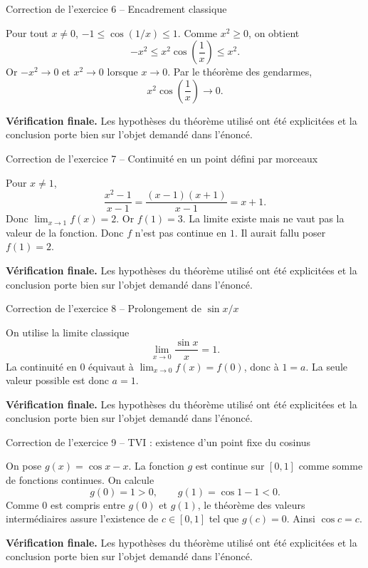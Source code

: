 \documentclass[11pt,a4paper]{article}
\begin{document}
\begin{corrbox}{Correction de l'exercice 6 -- Encadrement classique}

Pour tout $x\neq0$, $-1\leq\cos(1/x)\leq1$. Comme $x^2\geq0$, on obtient
\[
-x^2\leq x^2\cos\left(\frac1x\right)\leq x^2.
\]
Or $-x^2\to0$ et $x^2\to0$ lorsque $x\to0$. Par le théorème des gendarmes,
\[
x^2\cos\left(\frac1x\right)\to0.
\]

\medskip
\textbf{Vérification finale.} Les hypothèses du théorème utilisé ont été explicitées et la conclusion porte bien sur l'objet demandé dans l'énoncé.
\end{corrbox}


\begin{corrbox}{Correction de l'exercice 7 -- Continuité en un point défini par morceaux}

Pour $x\neq1$,
\[
\frac{x^2-1}{x-1}=\frac{(x-1)(x+1)}{x-1}=x+1.
\]
Donc $\lim_{x\to1}f(x)=2$. Or $f(1)=3$. La limite existe mais ne vaut pas la valeur de la fonction. Donc $f$ n'est pas continue en $1$. Il aurait fallu poser $f(1)=2$.

\medskip
\textbf{Vérification finale.} Les hypothèses du théorème utilisé ont été explicitées et la conclusion porte bien sur l'objet demandé dans l'énoncé.
\end{corrbox}


\begin{corrbox}{Correction de l'exercice 8 -- Prolongement de $\sin x/x$}

On utilise la limite classique
\[
\lim_{x\to0}\frac{\sin x}{x}=1.
\]
La continuité en $0$ équivaut à $\lim_{x\to0}f(x)=f(0)$, donc à $1=a$. La seule valeur possible est donc $a=1$.

\medskip
\textbf{Vérification finale.} Les hypothèses du théorème utilisé ont été explicitées et la conclusion porte bien sur l'objet demandé dans l'énoncé.
\end{corrbox}


\begin{corrbox}{Correction de l'exercice 9 -- TVI : existence d'un point fixe du cosinus}

On pose $g(x)=\cos x-x$. La fonction $g$ est continue sur $[0,1]$ comme somme de fonctions continues. On calcule
\[
g(0)=1>0,\qquad g(1)=\cos1-1<0.
\]
Comme $0$ est compris entre $g(0)$ et $g(1)$, le théorème des valeurs intermédiaires assure l'existence de $c\in[0,1]$ tel que $g(c)=0$. Ainsi $\cos c=c$.

\medskip
\textbf{Vérification finale.} Les hypothèses du théorème utilisé ont été explicitées et la conclusion porte bien sur l'objet demandé dans l'énoncé.
\end{corrbox}
\end{document}
